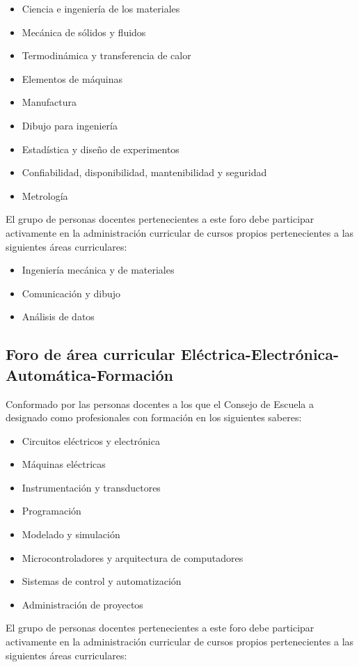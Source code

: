 \begin{itemize}
\item Ciencia e ingeniería de los materiales
\item Mecánica de sólidos y fluidos
\item Termodinámica y transferencia de calor
\item Elementos de máquinas
\item Manufactura
\item Dibujo para ingeniería
\item Estadística y diseño de experimentos
\item Confiabilidad, disponibilidad, mantenibilidad y seguridad
\item Metrología
\end{itemize}
El grupo de personas docentes pertenecientes a este foro debe participar activamente en la administración curricular de cursos propios pertenecientes a las siguientes áreas curriculares:\par

\begin{itemize}
\item Ingeniería mecánica y de materiales
\item Comunicación y dibujo
\item Análisis de datos
\end{itemize}
\subsection*{Foro de área curricular Eléctrica-Electrónica-Automática-Formación}

Conformado por las personas docentes a los que el Consejo de Escuela a designado como profesionales con formación en los siguientes saberes:\par

\begin{itemize}
\item Circuitos eléctricos y electrónica
\item Máquinas eléctricas
\item Instrumentación y transductores
\item Programación
\item Modelado y simulación
\item Microcontroladores y arquitectura de computadores
\item Sistemas de control y automatización
\item Administración de proyectos
\end{itemize}
El grupo de personas docentes pertenecientes a este foro debe participar activamente en la administración curricular de cursos propios pertenecientes a las siguientes áreas curriculares:\par

